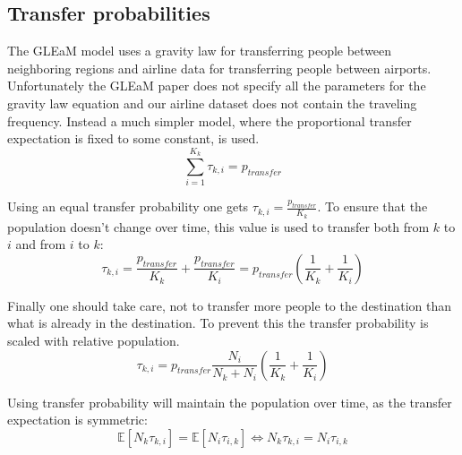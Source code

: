 \subsection{Transfer probabilities}

The GLEaM model \cite{GLEaM} uses a gravity law for transferring people between neighboring regions and airline data for transferring people between airports. Unfortunately the GLEaM paper does not specify all the parameters for the gravity law equation and our airline dataset does not contain the traveling frequency. Instead a much simpler model, where the proportional transfer expectation is fixed to some constant, is used.
\begin{equation}
\sum_{i = 1}^{K_k} \tau_{k, i} = p_{transfer}
\end{equation}

Using an equal transfer probability one gets $\tau_{k, i} = \frac{p_{transfer}}{K_k}$. To ensure that the population doesn't change over time, this value is used to transfer both from $k$ to $i$ and from $i$ to $k$:
\begin{equation}
\tau_{k, i} = \frac{p_{transfer}}{K_k} + \frac{p_{transfer}}{K_i} = p_{transfer} \left(\frac{1}{K_k} + \frac{1}{K_i}\right)
\end{equation}

Finally one should take care, not to transfer more people to the destination than what is already in the destination. To prevent this the transfer probability is scaled with relative population.
\begin{equation}
\tau_{k, i} = p_{transfer} \frac{N_i}{N_k + N_i} \left(\frac{1}{K_k} + \frac{1}{K_i}\right)
\end{equation}

Using transfer probability will maintain the population over time, as the transfer expectation is symmetric:
\begin{equation}
\mathbb{E}[N_k \tau_{k, i}] = \mathbb{E}[N_i \tau_{i, k}] \Leftrightarrow N_k \tau_{k, i} = N_i \tau_{i, k}
\end{equation}

